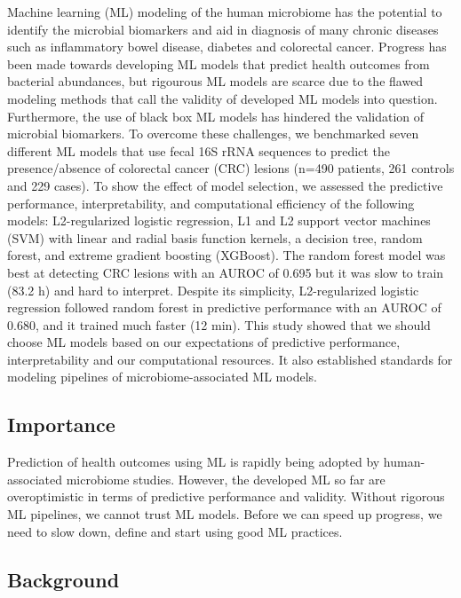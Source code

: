 \documentclass[11pt,]{article}
\begin{document}
Machine learning (ML) modeling of the human microbiome has the potential
to identify the microbial biomarkers and aid in diagnosis of many
chronic diseases such as inflammatory bowel disease, diabetes and
colorectal cancer. Progress has been made towards developing ML models
that predict health outcomes from bacterial abundances, but rigourous ML
models are scarce due to the flawed modeling methods that call the
validity of developed ML models into question. Furthermore, the use of
black box ML models has hindered the validation of microbial biomarkers.
To overcome these challenges, we benchmarked seven different ML models
that use fecal 16S rRNA sequences to predict the presence/absence of
colorectal cancer (CRC) lesions (n=490 patients, 261 controls and 229
cases). To show the effect of model selection, we assessed the
predictive performance, interpretability, and computational efficiency
of the following models: L2-regularized logistic regression, L1 and L2
support vector machines (SVM) with linear and radial basis function
kernels, a decision tree, random forest, and extreme gradient boosting
(XGBoost). The random forest model was best at detecting CRC lesions
with an AUROC of 0.695 but it was slow to train (83.2 h) and hard to
interpret. Despite its simplicity, L2-regularized logistic regression
followed random forest in predictive performance with an AUROC of 0.680,
and it trained much faster (12 min). This study showed that we should
choose ML models based on our expectations of predictive performance,
interpretability and our computational resources. It also established
standards for modeling pipelines of microbiome-associated ML models.

\subsection{Importance}\label{importance}

Prediction of health outcomes using ML is rapidly being adopted by
human-associated microbiome studies. However, the developed ML so far
are overoptimistic in terms of predictive performance and validity.
Without rigorous ML pipelines, we cannot trust ML models. Before we can
speed up progress, we need to slow down, define and start using good ML
practices.

\newpage

\subsection{Background}\label{background}
\end{document}
